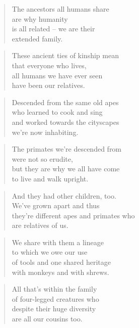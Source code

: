 \documentclass[10pt,a4paper]{article}
\begin{document}
\begin{paracol}{2}
\begin{verse}
The ancestors all humans share\\
are why humanity\\
is all related – we are their\\
extended family.
\end{verse}

\begin{verse}
These ancient ties of kinship mean\\
that everyone who lives,\\
all humans we have ever seen\\
have been our relatives.
\end{verse}

\begin{verse}
Descended from the same old apes\\
who learned to cook and sing\\
and worked towards the cityscapes\\
we’re now inhabiting.
\end{verse}

\begin{verse}
The primates we’re descended from\\
were not so erudite,\\
but they are why we all have come\\
to live and walk upright.
\end{verse}

\begin{verse}
And they had other children, too.\\
We’ve grown apart and thus\\
they’re different apes and primates who\\
are relatives of us.
\end{verse}

\begin{verse}
We share with them a lineage\\
to which we owe our use\\
of tools and one shared heritage\\
with monkeys and with shrews.
\end{verse}

\begin{verse}
All that’s within the family\\
of four-legged creatures who\\
despite their huge diversity\\
are all our cousins too.
\end{verse}


\end{paracol}
\end{document}
